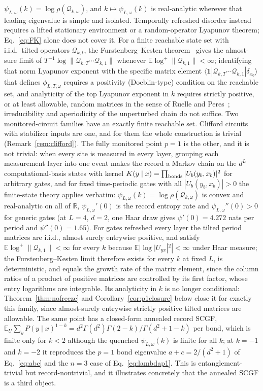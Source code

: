 \documentclass[aps,prx,reprint,superscriptaddress,nobibnotes,longbibliography]{revtex4-2}
\theoremstyle{remark}
\newcommand{\E}{\mathbb E}
\begin{document}
$\psi_{L,\omega}(k)=\log\rho(\mathcal Q_{k,\omega})$, and $k\mapsto\psi_{L,\omega}(k)$ is real-analytic wherever that leading eigenvalue is simple and isolated.  Temporally refreshed disorder instead requires a lifted stationary environment or a random-operator Lyapunov theorem; Eq.~\eqref{eq:FK} alone does not cover it.  For a finite reachable state set with i.i.d.\ tilted operators $\mathcal Q_{k,t}$, the Furstenberg--Kesten theorem~\cite{FurstenbergKesten1960} gives the almost-sure limit of $T^{-1}\log\|\mathcal Q_{k,T}\cdots\mathcal Q_{k,1}\|$ whenever $\E\log^+\|\mathcal Q_{k,1}\|<\infty$; identifying that norm Lyapunov exponent with the specific matrix element $\langle\mathbf 1|\mathcal Q_{k,T}\cdots\mathcal Q_{k,1}|\delta_{x_0}\rangle$ that defines $\phi_{L,T,\omega}$ requires a positivity (Doeblin-type) condition on the reachable set, and analyticity of the top Lyapunov exponent in $k$ requires strictly positive, or at least allowable, random matrices in the sense of Ruelle and Peres~\cite{Ruelle1979,Peres1992}; irreducibility and aperiodicity of the unperturbed chain do not suffice.  Two monitored-circuit families have an exactly finite reachable set.  Clifford circuits with stabilizer inputs are one, and for them the whole construction is trivial (Remark~\ref{rem:clifford}).  The fully monitored point $p=1$ is the other, and it is not trivial: when every site is measured in every layer, grouping each measurement layer into one event makes the record a Markov chain on the $d^L$ computational-basis states with kernel $K(y\mid x)=\prod_{\rm bonds}|U_b(y_b,x_b)|^2$ for arbitrary gates, and for fixed time-periodic gates with all $|U_b(y_b,x_b)|>0$ the finite-state theory applies verbatim: $\psi_{L,\omega}(k)=\log\rho(\mathcal Q_{k,\omega})$ is convex and real-analytic on all of $\mathbb R$, $\psi_{L,\omega}'(0)$ is the record entropy rate and $\psi_{L,\omega}''(0)>0$ for generic gates (at $L=4$, $d=2$, one Haar draw gives $\psi'(0)=4.272$ nats per period and $\psi''(0)=1.65$).  For gates refreshed every layer the tilted period matrices are i.i.d., almost surely entrywise positive, and satisfy $\E\log^+\|\mathcal Q_{k,1}\|<\infty$ for every $k$ because $\E|\log|U_{yx}|^2|<\infty$ under Haar measure; the Furstenberg--Kesten limit therefore exists for every $k$ at fixed $L$, is deterministic, and equals the growth rate of the matrix element, since the column ratios of a product of positive matrices are controlled by its first factor, whose entry logarithms are integrable.  Its analyticity in $k$ is no longer conditional: Theorem~\ref{thm:nofreeze} and Corollary~\ref{cor:p1closure} below close it for exactly this family, since almost-surely entrywise strictly positive tilted matrices are allowable.  The same point has a closed-form annealed record SCGF, $\E_U\sum_yP(y\mid x)^{1-k}=d^2\Gamma(d^2)\Gamma(2-k)/\Gamma(d^2+1-k)$ per bond, which is finite only for $k<2$ although the quenched $\psi_{L,\omega}(k)$ is finite for all $k$; at $k=-1$ and $k=-2$ it reproduces the $p=1$ bond eigenvalue $a+c=2/(d^2+1)$ of Eq.~\eqref{eq:abc} and the $n=3$ case of Eq.~\eqref{eq:lambdap1}.  This is entanglement-trivial but record-nontrivial, and it illustrates concretely that the annealed SCGF is a third object.
\end{document}
